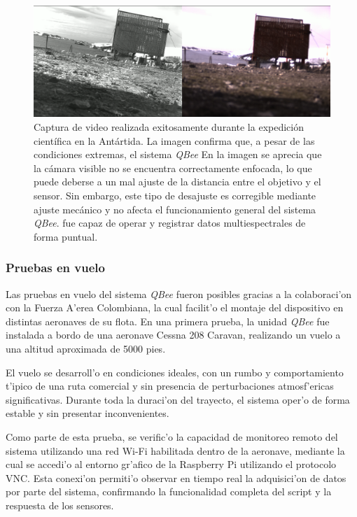     \begin{figure}[h]
    \centering
    \includegraphics[width=1\textwidth]{Figures/C4/pinguinos.png}
    \caption{Captura de video realizada exitosamente durante la expedición científica en la Antártida. La imagen confirma que, a pesar de las condiciones extremas, el sistema \textit{QBee} En la imagen se aprecia que la cámara visible no se encuentra correctamente enfocada, lo que puede deberse a un mal ajuste de la distancia entre el objetivo y el sensor. Sin embargo, este tipo de desajuste es corregible mediante ajuste mecánico y no afecta el funcionamiento general del sistema \textit{QBee}. fue capaz de operar y registrar datos multiespectrales de forma puntual.}
    \label{fig:prueba_antartida}
    \end{figure}

    \subsubsection{Pruebas en vuelo}

    Las pruebas en vuelo del sistema \textit{QBee} fueron posibles gracias a la colaboraci'on con la Fuerza A'erea Colombiana, la cual facilit'o el montaje del dispositivo en distintas aeronaves de su flota. En una primera prueba, la unidad \textit{QBee} fue instalada a bordo de una aeronave Cessna 208 Caravan, realizando un vuelo a una altitud aproximada de 5000 pies.
    
    \noindent El vuelo se desarroll'o en condiciones ideales, con un rumbo y comportamiento t'ipico de una ruta comercial y sin presencia de perturbaciones atmosf'ericas significativas. Durante toda la duraci'on del trayecto, el sistema oper'o de forma estable y sin presentar inconvenientes.
    
    \noindent Como parte de esta prueba, se verific'o la capacidad de monitoreo remoto del sistema utilizando una red Wi-Fi habilitada dentro de la aeronave, mediante la cual se accedi'o al entorno gr'afico de la Raspberry Pi utilizando el protocolo VNC. Esta conexi'on permiti'o observar en tiempo real la adquisici'on de datos por parte del sistema, confirmando la funcionalidad completa del script y la respuesta de los sensores.
    
